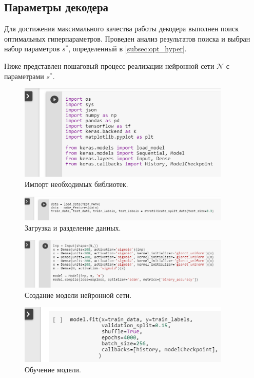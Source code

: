 \subsection{Параметры декодера}\label{subsec:arch}

Для достижения максимального качества работы декодера выполнен поиск оптимальных гиперпараметров. Проведен анализ результатов поиска и выбран набор параметров $s^*$, определенный в \ref{subsec:opt_hyper}.

Ниже представлен пошаговый процесс реализации нейронной сети $\mathcal{N}$ с параметрами $s^*$.

\begin{figure}[h]
    \centering
    \includegraphics[width=0.9\textwidth]{neural_network_import.png}
    \caption{Импорт необходимых библиотек.}
    \label{fig:neural_network_import}
\end{figure}

\begin{figure}[h]
    \centering
    \includegraphics[width=0.9\textwidth]{neural_network_load.png}
    \caption{Загрузка и разделение данных.}
    \label{fig:neural_network_import}
\end{figure}


\begin{figure}[h]
    \centering
    \includegraphics[width=0.9\textwidth]{neural_network_create.png}
    \caption{Создание модели нейронной сети.}
    \label{fig:neural_network_create}
\end{figure}

\newpage

\begin{figure}[h]
    \centering
    \includegraphics[width=0.9\textwidth]{neural_network_fit.png}
    \caption{Обучение модели.}
    \label{fig:neural_network_fir}
\end{figure}
